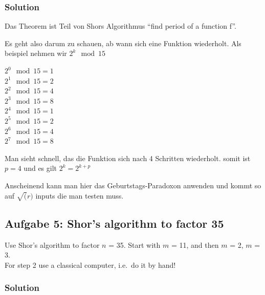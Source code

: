 \documentclass[11pt]{article}
\begin{document}
\hypertarget{solution}{%
\subsubsection{Solution}\label{solution}}

Das Theorem ist Teil von Shors Algorithmus ``find period of a function
f''.

Es geht also darum zu schauen, ab wann sich eine Funktion wiederholt.
Als beispiel nehmen wir \(2^{k} \mod 15\)

\(2^{0} \mod 15 = 1\)\\
\(2^{1} \mod 15 = 2\)\\
\(2^{2} \mod 15 = 4\)\\
\(2^{3} \mod 15 = 8\)\\
\(2^{4} \mod 15 = 1\)\\
\(2^{5} \mod 15 = 2\)\\
\(2^{6} \mod 15 = 4\)\\
\(2^{7} \mod 15 = 8\)

Man sieht schnell, das die Funktion sich nach 4 Schritten wiederholt.
somit ist \(p=4\) und es gilt \(2^{k} = 2^{k+p}\)

Anscheinend kann man hier das Geburtstags-Paradoxon anwenden und kommt
so auf \(\sqrt(r)\) inputs die man testen muss.

    \hypertarget{aufgabe-5-shors-algorithm-to-factor-35}{%
\subsection{Aufgabe 5: Shor's algorithm to factor
35}\label{aufgabe-5-shors-algorithm-to-factor-35}}

Use Shor's algorithm to factor \(n\) = 35. Start with \(m\) = 11, and
then \(m\) = 2, \(m\) = 3.\\
For step 2 use a classical computer, i.e.~do it by hand!

\hypertarget{solution}{%
\subsubsection{Solution}\label{solution}}
\end{document}
